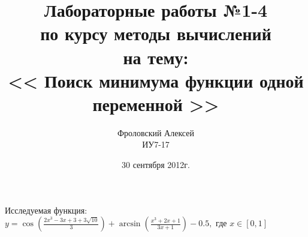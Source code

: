\documentclass[a4paper,12pt]{report}
\author{Фроловский Алексей \\ ИУ7-17}
\title{Лабораторные работы №1-4 \\ по курсу методы вычислений \\ на тему: \\  
<< Поиск минимума функции одной переменной >> }
\date{30 сентября 2012г.}
\begin{document}
\maketitle
Исследуемая функция: \\
\begin{math}
y=\cos{(\frac{2x^3 - 3x + 3 + 3\sqrt{10}}{3})}+\arcsin{(\frac{x^3 + 2x + 1}{3x + 1})} - 0.5,
\end{math}
где
\begin{math}
 x\in[0, 1]
\end{math}

\begin{center}
    
\end{center}
\end{document}
